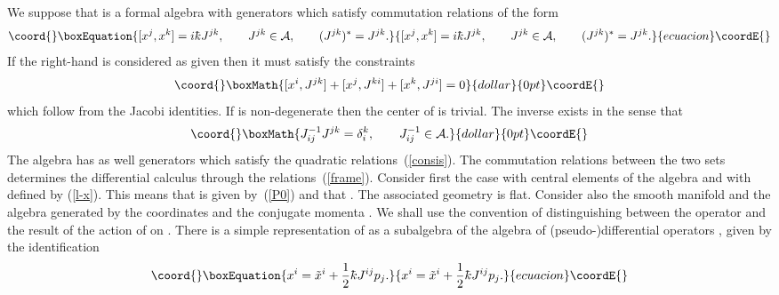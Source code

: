 \documentclass[a4paper,12pt]{article}
\def\p{\partial}
\def\t#1{\tilde #1}
\def\b#1{{\mathbb #1}}
\def\c#1{{\cal #1}}
\def\kbar{{\mathchar'26\mkern-9muk}}
\def\t#1{\tilde #1}
\begin{document}
We suppose that \myHighlight{$\c{A}$}\coordHE{} is a formal algebra with \coordHE{} generators \coordHE{}
which satisfy commutation relations of the form
\begin{equation}\coord{}\boxEquation{
[x^j, x^k] = i\kbar J^{jk}, \qquad J^{jk} \in \c{A}, 
\qquad (J^{jk})^* = J^{jk}.                                    \label{c-r}
}{
[x^j, x^k] = i\kbar J^{jk}, \qquad J^{jk} \in \c{A}, 
\qquad (J^{jk})^* = J^{jk}.                                    }{ecuacion}\coordE{}\end{equation}
If the right-hand is considered as given then it must satisfy the
constraints
$$\coord{}\boxMath{
[x^i, J^{jk}] + [x^j, J^{ki}] +[x^k, J^{ji}] = 0
}{dollar}{0pt}\coordE{}$$
which follow from the Jacobi identities.  If \coordHE{} is
non-degenerate then the center of \myHighlight{$\c{A}$}\coordHE{} is trivial. The inverse
\coordHE{} exists in the sense that
$$\coord{}\boxMath{
J^{-1}_{ij} J^{jk} = \delta_i^k, \qquad J^{-1}_{ij} \in \c{A}.
}{dollar}{0pt}\coordE{}$$
The algebra has as well \coordHE{} generators \coordHE{} which satisfy
the quadratic relations~(\ref{consis}). The commutation relations
between the two sets determines the differential calculus through the
relations~(\ref{frame}).  Consider first the case with \coordHE{}
central elements of the algebra and with \coordHE{} defined by
(\ref{l-x}). This means that \coordHE{} is given by~(\ref{P0})
and that \coordHE{}. The associated geometry is flat.  Consider
also the smooth manifold \myHighlight{$V = \b{R}^n$}\coordHE{} and the algebra \myHighlight{$\t{\c{A}}$}\coordHE{}
generated by the coordinates \myHighlight{$\t{x}^i$}\coordHE{} and the conjugate momenta
\coordHE{}. We shall use the convention of distinguishing between the
operator \coordHE{} and the result \myHighlight{$i\t{\p}_j f$}\coordHE{} of the action of \coordHE{} on
\coordHE{}. There is a simple representation of \myHighlight{$\c{A}$}\coordHE{} as a subalgebra of
the algebra of (pseudo-)differential operators \myHighlight{$\t{\c{A}}$}\coordHE{}, given by
the identification
\begin{equation}\coord{}\boxEquation{
x^i = \t{x}^i + \frac 12 \kbar J^{ij} p_j.                 \label{deriv}
}{
x^i = \t{x}^i + \frac 12 \kbar J^{ij} p_j.                 }{ecuacion}\coordE{}\end{equation}
\end{document}
